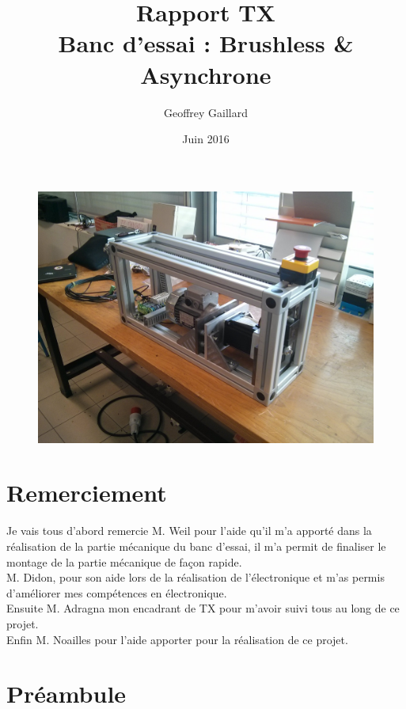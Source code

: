 \documentclass[11pt]{article}
\title{Rapport TX \\ Banc d'essai : Brushless \& Asynchrone}
\author{Geoffrey Gaillard}
\date{Juin 2016}
\begin{document}
\maketitle
\thispagestyle{empty}

\begin{figure}[!h]
    \centering
    \includegraphics[width=450px]{IMG_20160628_183017.jpg}
\end{figure}
\newpage

\thispagestyle{empty}
\tableofcontents{}
\newpage

\setcounter{page}{1}

\section*{Remerciement}

Je vais tous d'abord remercie M. Weil pour l'aide qu'il m'a apporté dans la réalisation de la partie mécanique du banc d'essai, il m'a permit de finaliser le montage de la partie mécanique de façon rapide.\\
M. Didon, pour son aide lors de la réalisation de l'électronique et m'as permis d'améliorer mes compétences en électronique.\\
Ensuite M. Adragna mon encadrant de TX pour m'avoir suivi tous au long de ce projet.\\
Enfin M. Noailles pour l'aide apporter pour la réalisation de ce projet.

\newpage

\section*{Préambule}
\end{document}
